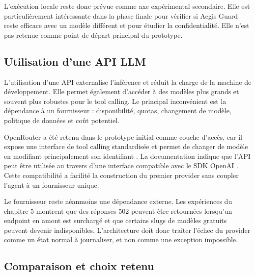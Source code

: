L'exécution locale reste donc prévue comme axe expérimental secondaire. Elle est particulièrement intéressante dans la phase finale pour vérifier si Aegis Guard reste efficace avec un modèle différent et pour étudier la confidentialité. Elle n'est pas retenue comme point de départ principal du prototype.

\subsection{Utilisation d'une API LLM}

L'utilisation d'une API externalise l'inférence et réduit la charge de la machine de développement. Elle permet également d'accéder à des modèles plus grands et souvent plus robustes pour le tool calling. Le principal inconvénient est la dépendance à un fournisseur : disponibilité, quotas, changement de modèle, politique de données et coût potentiel.

OpenRouter a été retenu dans le prototype initial comme couche d'accès, car il expose une interface de tool calling standardisée et permet de changer de modèle en modifiant principalement son identifiant \cite{openroutertools}. La documentation indique que l'API peut être utilisée au travers d'une interface compatible avec le SDK OpenAI \cite{openrouterquickstart}. Cette compatibilité a facilité la construction du premier provider sans coupler l'agent à un fournisseur unique.

Le fournisseur reste néanmoins une dépendance externe. Les expériences du chapitre 5 montrent que des réponses 502 peuvent être retournées lorsqu'un endpoint en amont est surchargé et que certains slugs de modèles gratuits peuvent devenir indisponibles. L'architecture doit donc traiter l'échec du provider comme un état normal à journaliser, et non comme une exception impossible.

\subsection{Comparaison et choix retenu}

